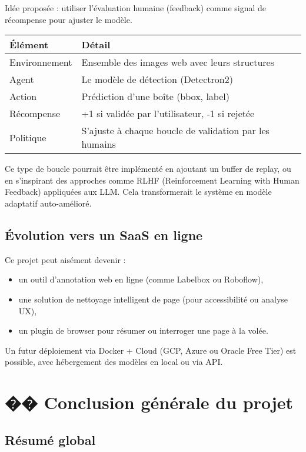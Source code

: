\documentclass[12pt,a4paper]{report}
\begin{document}
Idée proposée : utiliser l'évaluation humaine (feedback) comme signal de récompense pour ajuster le modèle.

\begin{longtable}{|p{3cm}|p{11cm}|}
\hline
\textbf{Élément} & \textbf{Détail} \\
\hline
Environnement & Ensemble des images web avec leurs structures \\
\hline
Agent & Le modèle de détection (Detectron2) \\
\hline
Action & Prédiction d'une boîte (bbox, label) \\
\hline
Récompense & +1 si validée par l'utilisateur, -1 si rejetée \\
\hline
Politique & S'ajuste à chaque boucle de validation par les humains \\
\hline
\end{longtable}

Ce type de boucle pourrait être implémenté en ajoutant un buffer de replay, ou en s'inspirant des approches comme RLHF (Reinforcement Learning with Human Feedback) appliquées aux LLM. Cela transformerait le système en modèle adaptatif auto-amélioré.

\section{Évolution vers un SaaS en ligne}

Ce projet peut aisément devenir :
\begin{itemize}
\item un outil d'annotation web en ligne (comme Labelbox ou Roboflow),
\item une solution de nettoyage intelligent de page (pour accessibilité ou analyse UX),
\item un plugin de browser pour résumer ou interroger une page à la volée.
\end{itemize}

Un futur déploiement via Docker + Cloud (GCP, Azure ou Oracle Free Tier) est possible, avec hébergement des modèles en local ou via API.

\chapter{�� Conclusion générale du projet}

\section{Résumé global}
\end{document}
